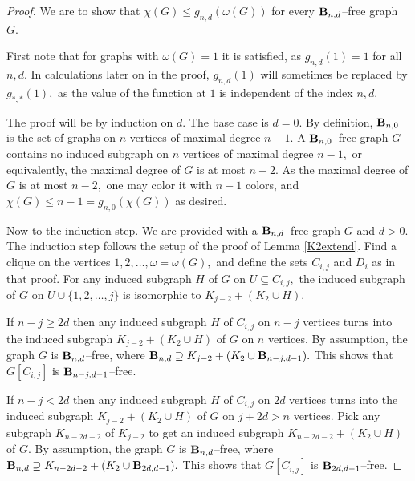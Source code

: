\documentclass{article}
\theoremstyle{plain}
\theoremstyle{definition}
\begin{document}
\begin{proof}
We are to show that $\chi(G) \leq g_{n,d}(\omega(G))$ for every ${\bf B}_{n,d}$--free graph $G.$

First note that for graphs with $\omega(G)=1$ it is satisfied, as $g_{n,d}(1)=1$ for all $n,d.$ In calculations later on in the proof, $g_{n,d}(1)$ will sometimes be replaced by $g_{\ast,\ast}(1),$ as the value of the function at $1$ is independent of the index $n,d.$

The proof will be by induction on $d.$ The base case is $d=0.$ By definition, ${\bf B}_{n,0}$ is the set of graphs on $n$ vertices of maximal degree $n-1.$ A ${\bf B}_{n,0}$--free graph $G$ contains no induced subgraph on 
$n$ vertices of maximal degree $n-1,$ or equivalently, the maximal degree of $G$ is at most $n-2.$ As the maximal degree of $G$ is at most $n-2,$ one may color it with $n-1$ colors, and $\chi(G) \leq n-1 = g_{n,0}(\chi(G))$ as desired.

Now to the induction step. We are provided with a ${\bf B}_{n,d}$--free graph $G$ and $d>0.$ The induction step follows the setup of the proof of Lemma \ref{K2extend}. Find a clique on the vertices $1,2,\ldots, \omega=\omega(G),$ and define the sets $C_{i,j}$ and $D_i$ as in that proof. For any induced subgraph $H$ of $G$ on $U\subseteq C_{i,j},$ the induced subgraph of $G$ on $U \cup \{1,2,\ldots,j\}$ is isomorphic to $K_{j-2}+(K_2 \cup H).$

If $n-j \geq 2d$ then any induced subgraph $H$ of $C_{i,j}$ on $n-j$ vertices turns into the induced subgraph $K_{j-2}+(K_2 \cup H)$ of $G$ on $n$ vertices. By assumption, the graph $G$ is ${\bf B}_{n,d}$--free, where
$ {\bf B}_{n,d} \supseteq K_{j-2}+(K_2\cup {\bf B}_{n-j,d-1}).$ This shows that $G[C_{i,j}]$ is  ${\bf B}_{n-j,d-1}$--free.

If $n-j < 2d$ then any induced subgraph $H$ of $C_{i,j}$ on $2d$ vertices turns into the induced subgraph $K_{j-2}+(K_2 \cup H)$ of $G$ on $j+2d>n$ vertices. Pick any subgraph $K_{n-2d-2}$ of $K_{j-2}$ to get an induced subgraph $K_{n-2d-2}+(K_2 \cup H)$ of $G.$  By assumption, the graph $G$ is ${\bf B}_{n,d}$--free, where $ {\bf B}_{n,d} \supseteq K_{n-2d-2}+(K_2\cup {\bf B}_{2d,d-1}).$ This shows that $G[C_{i,j}]$ is  ${\bf B}_{2d,d-1}$--free.


\end{proof}
\end{document}
